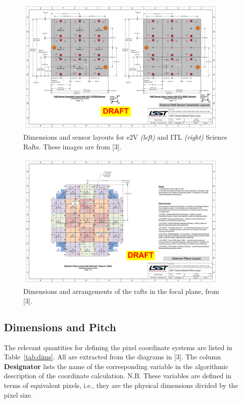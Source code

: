 \documentclass{article}[12pt]
\begin{document}
\begin{figure}
\centering
    \includegraphics[width=0.95\textwidth]{raft_layout.pdf}
    \caption{Dimensions and sensor layouts for e2V {\it (left)} and ITL {\it (right)} Science Rafts.  These images are from [3].}
    \label{fig:raft}
\end{figure}

\begin{figure}
\centering
    \includegraphics[width=0.95\textwidth]{focal_plane_layout.pdf}
    \caption{Dimensions and arrangements of the rafts in the focal plane, from [3].}
    \label{fig:focalplane}
\end{figure}

\subsection{Dimensions and Pitch}
The relevant quantities for defining the pixel coordinate systems are listed in Table~\ref{tab:dims}.  All are extracted from the diagrams in [3].  The column {\bf Designator} lists the name of the corresponding variable in the algorithmic description of the coordinate calculation.  N.B. These variables are defined in terms of equivalent pixels, i.e., they are the physical dimensions divided by the pixel size.
\end{document}
